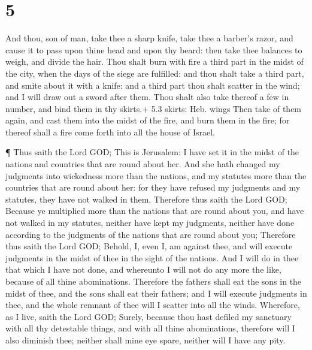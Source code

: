 \hypertarget{section-4}{%
\section{5}\label{section-4}}

 And thou, son of man, take thee a sharp knife, take thee a
barber's razor, and cause it to pass upon thine head and upon thy beard:
then take thee balances to weigh, and divide the hair.  Thou
shalt burn with fire a third part in the midst of the city, when the
days of the siege are fulfilled: and thou shalt take a third part, and
smite about it with a knife: and a third part thou shalt scatter in the
wind; and I will draw out a sword after them.  Thou shalt
also take thereof a few in number, and bind them in thy skirts.+ 5.3
skirts: Heb. wings  Then take of them again, and cast them
into the midst of the fire, and burn them in the fire; for thereof shall
a fire come forth into all the house of Israel.

 ¶ Thus saith the Lord GOD; This is Jerusalem: I have set it
in the midst of the nations and countries that are round about her.
 And she hath changed my judgments into wickedness more than
the nations, and my statutes more than the countries that are round
about her: for they have refused my judgments and my statutes, they have
not walked in them.  Therefore thus saith the Lord GOD;
Because ye multiplied more than the nations that are round about you,
and have not walked in my statutes, neither have kept my judgments,
neither have done according to the judgments of the nations that are
round about you;  Therefore thus saith the Lord GOD; Behold,
I, even I, am against thee, and will execute judgments in the midst of
thee in the sight of the nations.  And I will do in thee
that which I have not done, and whereunto I will not do any more the
like, because of all thine abominations.  Therefore the
fathers shall eat the sons in the midst of thee, and the sons shall eat
their fathers; and I will execute judgments in thee, and the whole
remnant of thee will I scatter into all the winds. 
Wherefore, as I live, saith the Lord GOD; Surely, because thou hast
defiled my sanctuary with all thy detestable things, and with all thine
abominations, therefore will I also diminish thee; neither shall mine
eye spare, neither will I have any pity.

